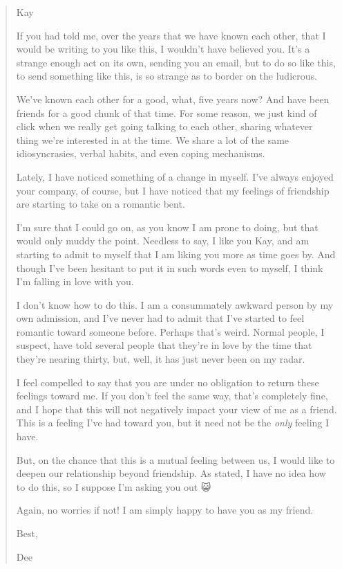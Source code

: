 \begin{quote}
Kay

If you had told me, over the years that we have known each other, that I would be writing to you like this, I wouldn't have believed you. It's a strange enough act on its own, sending you an email, but to do so like this, to send something like this, is so strange as to border on the ludicrous.

We've known each other for a good, what, five years now? And have been friends for a good chunk of that time. For some reason, we just kind of click when we really get going talking to each other, sharing whatever thing we're interested in at the time. We share a lot of the same idiosyncrasies, verbal habits, and even coping mechanisms.

Lately, I have noticed something of a change in myself. I've always enjoyed your company, of course, but I have noticed that my feelings of friendship are starting to take on a romantic bent.

I'm sure that I could go on, as you know I am prone to doing, but that would only muddy the point. Needless to say, I like you Kay, and am starting to admit to myself that I am liking you more as time goes by. And though I've been hesitant to put it in such words even to myself, I think I'm falling in love with you.

I don't know how to do this. I am a consummately awkward person by my own admission, and I've never had to admit that I've started to feel romantic toward someone before. Perhaps that's weird. Normal people, I suspect, have told several people that they're in love by the time that they're nearing thirty, but, well, it has just never been on my radar.

I feel compelled to say that you are under no obligation to return these feelings toward me. If you don't feel the same way, that's completely fine, and I hope that this will not negatively impact your view of me as a friend. This is a feeling I've had toward you, but it need not be the \emph{only} feeling I have.

But, on the chance that this is a mutual feeling between us, I would like to deepen our relationship beyond friendship. As stated, I have no idea how to do this, so I suppose I'm asking you out {\SmileyFont 😺}

Again, no worries if not! I am simply happy to have you as my friend.

Best,

Dee
\end{quote}

